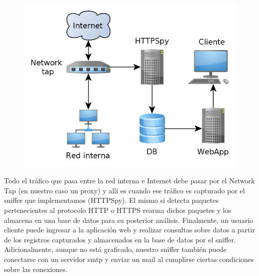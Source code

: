 \begin{figure}[hbtp]
    \centering
	\includegraphics[scale=0.4]{img/deploy.png}
\end{figure}

Todo el tráfico que pasa entre la red interna e Internet debe pasar por el Network Tap (en nuestro caso un proxy) y allí es cuando ese tráfico es capturado por el sniffer que implementamos (HTTPSpy). El mismo si detecta paquetes pertenecientes al protocolo HTTP o HTTPS rearma dichos paquetes y los almacena en una base de datos para su posterior análisis. Finalmente, un usuario cliente puede ingresar a la aplicación web y realizar consultas sobre datos a partir de los registros capturados y almacenados en la base de datos por el sniffer.
Adicionalmente, aunque no está graficado, nuestro sniffer también puede conectarse con un servidor smtp y enviar un mail al cumplirse ciertas condiciones sobre las conexiones.
